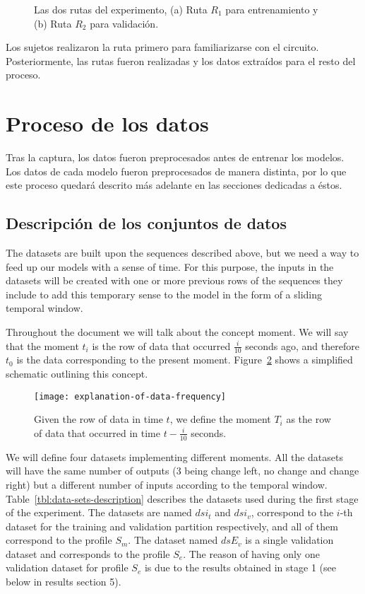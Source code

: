 {\begin{figure}
	\centering
	\qquad
	\caption{Las dos rutas del experimento, (a) Ruta $R_1$ para entrenamiento y (b) Ruta $R_2$ para validación.}
	\label{fig:proposed-routes}
\end{figure}

Los sujetos realizaron la ruta primero para familiarizarse con el circuito. Posteriormente, las rutas fueron realizadas y los datos extraídos para el resto del proceso.

\section{Proceso de los datos}

Tras la captura, los datos fueron preprocesados antes de entrenar los modelos. Los datos de cada modelo fueron preprocesados de manera distinta, por lo que este proceso quedará descrito más adelante en las secciones dedicadas a éstos.

\subsection{Descripción de los conjuntos de datos}

The datasets are built upon the sequences described above, but we need a way to feed up our models with a sense of time. For this purpose, the inputs in the datasets will be created with one or more previous rows of the sequences they include to add this temporary sense to the model in the form of a sliding temporal window.

Throughout the document we will talk about the concept moment. We will say that the moment $t_i$ is the row of data that occurred $\frac{i}{10}$ seconds ago, and therefore $t_0$ is the data corresponding to the present moment. Figure~\ref{fig:explanation-of-data-frequency} shows a simplified schematic outlining this concept.

\begin{figure}
	\texttt{[image: explanation-of-data-frequency]}
	\caption{Given the row of data in time $t$, we define the moment $T_i$ as the row of data that occurred in time $t - \frac{i}{10}$ seconds.}
	\label{fig:explanation-of-data-frequency}
\end{figure}

We will define four datasets implementing different moments. All the datasets will have the same number of outputs (3 being change left, no change and change right) but a different number of inputs according to the temporal window. Table~\ref{tbl:data-sets-description} describes the datasets used during the first stage of the experiment. The datasets are named $dsi_t$ and $dsi_v$, correspond to the $i$-th dataset for the training and validation partition respectively, and all of them correspond to the profile $S_m$. The dataset named $dsE_v$ is a single validation dataset and corresponds to the profile $S_e$. The reason of having only one validation dataset for profile $S_e$ is due to the results obtained in stage 1 (see below in results section 5).

}
